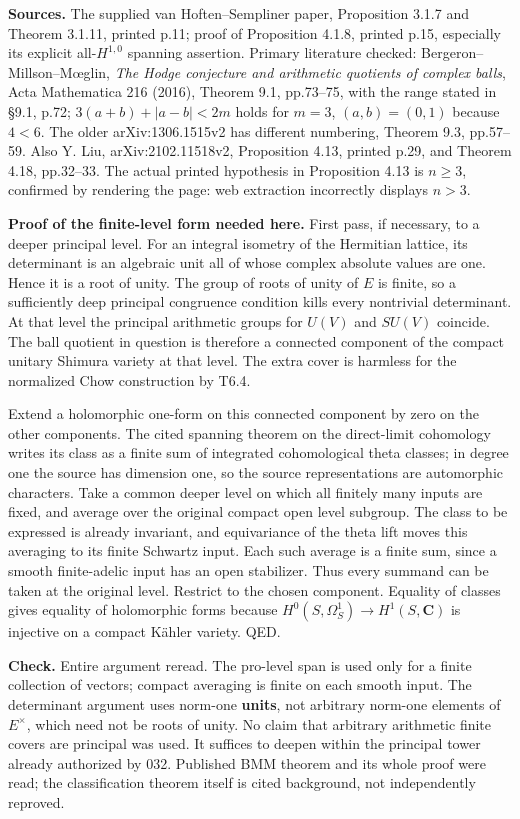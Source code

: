 \documentclass[11pt,a4paper]{article}
\theoremstyle{definition}
\begin{document}
\textbf{Sources.} The supplied van Hoften--Sempliner paper, Proposition 3.1.7 and Theorem 3.1.11, printed p.11; proof of Proposition 4.1.8, printed p.15, especially its explicit all-\(H^{1,0}\) spanning assertion. Primary literature checked: Bergeron--Millson--Mœglin, \emph{The Hodge conjecture and arithmetic quotients of complex balls}, Acta Mathematica 216 (2016), Theorem 9.1, pp.73--75, with the range stated in §9.1, p.72; \(3(a+b)+|a-b|<2m\) holds for \(m=3\), \((a,b)=(0,1)\) because \(4<6\). The older arXiv:1306.1515v2 has different numbering, Theorem 9.3, pp.57--59. Also Y. Liu, arXiv:2102.11518v2, Proposition 4.13, printed p.29, and Theorem 4.18, pp.32--33. The actual printed hypothesis in Proposition 4.13 is \(n\ge3\), confirmed by rendering the page: web extraction incorrectly displays \(n>3\).

\textbf{Proof of the finite-level form needed here.} First pass, if necessary, to a deeper principal level. For an integral isometry of the Hermitian lattice, its determinant is an algebraic unit all of whose complex absolute values are one. Hence it is a root of unity. The group of roots of unity of \(E\) is finite, so a sufficiently deep principal congruence condition kills every nontrivial determinant. At that level the principal arithmetic groups for \(U(V)\) and \(SU(V)\) coincide. The ball quotient in question is therefore a connected component of the compact unitary Shimura variety at that level. The extra cover is harmless for the normalized Chow construction by T6.4.

Extend a holomorphic one-form on this connected component by zero on the other components. The cited spanning theorem on the direct-limit cohomology writes its class as a finite sum of integrated cohomological theta classes; in degree one the source has dimension one, so the source representations are automorphic characters. Take a common deeper level on which all finitely many inputs are fixed, and average over the original compact open level subgroup. The class to be expressed is already invariant, and equivariance of the theta lift moves this averaging to its finite Schwartz input. Each such average is a finite sum, since a smooth finite-adelic input has an open stabilizer. Thus every summand can be taken at the original level. Restrict to the chosen component. Equality of classes gives equality of holomorphic forms because \(H^0(S,\Omega^1_S)\to H^1(S,\mathbf C)\) is injective on a compact Kähler variety. QED.

\textbf{Check.} Entire argument reread. The pro-level span is used only for a finite collection of vectors; compact averaging is finite on each smooth input. The determinant argument uses norm-one \textbf{units}, not arbitrary norm-one elements of \(E^\times\), which need not be roots of unity. No claim that arbitrary arithmetic finite covers are principal was used. It suffices to deepen within the principal tower already authorized by 032. Published BMM theorem and its whole proof were read; the classification theorem itself is cited background, not independently reproved.
\end{document}
